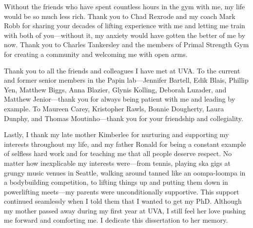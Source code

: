 \documentclass[11pt,twocolumn,notitlepage,openany,twoside]{book}
\begin{document}
Without the friends who have spent countless hours in the gym with me, my life would be so much less rich. Thank you to Chad Rexrode and my coach Mark Robb for sharing your decades of lifting experience with me and letting me train with both of you---without it, my anxiety would have gotten the better of me by now. Thank you to Charles Tankersley and the members of Primal Strength Gym for creating a community and welcoming me with open arms.

Thank you to all the friends and colleagues I have met at UVA. To the current and former senior members in the Papin lab---Jennifer Bartell, Edik Blais, Phillip Yen, Matthew Biggs, Anna Blazier, Glynis Kolling, Deborah Luzader, and Matthew Jenior---thank you for always being patient with me and leading by example. To Maureen Carey, Kristopher Rawls, Bonnie Dougherty, Laura Dunphy, and Thomas Moutinho---thank you for your friendship and collegiality.

Lastly, I thank my late mother Kimberlee for nurturing and supporting my interests throughout my life, and my father Ronald for being a constant example of selfless hard work and for teaching me that all people deserve respect. No matter how inexplicable my interests were---from tennis, playing ska gigs at grungy music venues in Seattle, walking around tanned like an oompa-loompa in a bodybuilding competition, to lifting things up and putting them down in powerlifting meets---my parents were unconditionally supportive. This support continued seamlessly when I told them that I wanted to get my PhD. Although my mother passed away during my first year at UVA, I still feel her love pushing me forward and comforting me. I dedicate this dissertation to her memory.

\mainmatter


\end{document}

